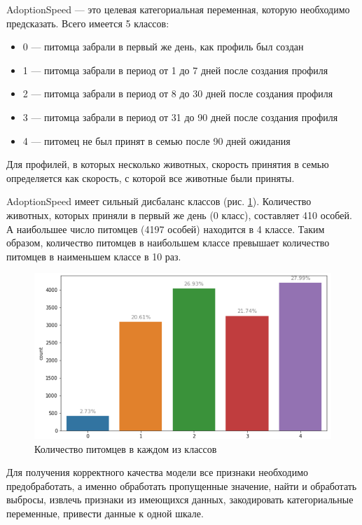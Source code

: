 \documentclass[14pt]{mmcs_article}
\begin{document}
AdoptionSpeed --- это целевая категориальная переменная, которую необходимо предсказать. Всего имеется 5 классов:

\begin{itemize}
	\item 0 --- питомца забрали в первый же день, как профиль был создан
	\item 1 --- питомца забрали в период от 1 до 7 дней после создания профиля
	\item 2 --- питомца забрали в период от 8 до 30 дней после создания профиля
	\item 3 --- питомца забрали в период от 31 до 90 дней после создания профиля
	\item 4 --- питомец не был принят в семью после 90 дней ожидания
\end{itemize}

Для профилей, в которых несколько животных, скорость принятия в семью определяется как скорость, с которой все животные были приняты. 

AdoptionSpeed имеет сильный дисбаланс классов (рис. \ref{analyse:speed}). Количество животных, которых приняли в первый же день (0 класс), составляет 410 особей. А наибольшее число питомцев (4197 особей) находится в 4 классе. Таким образом, количество питомцев в наибольшем классе превышает количество питомцев в наименьшем классе в 10 раз.

\begin{figure}[H]
	\centering
	\includegraphics[scale=0.8]{speed.png}
	\caption{Количество питомцев в каждом из классов}\label{analyse:speed}
\end{figure}

Для получения корректного качества модели все признаки необходимо предобработать, а именно обработать пропущенные значение, найти и обработать выбросы, извлечь признаки из имеющихся данных, закодировать категориальные переменные, привести данные к одной шкале.
\end{document}
